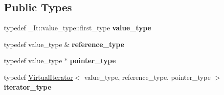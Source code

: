 \subsection*{Public Types}
\begin{DoxyCompactItemize}
\item 
typedef \+\_\+\+It\+::value\+\_\+type\+::first\+\_\+type {\bfseries value\+\_\+type}\hypertarget{classAudio_1_1VirtualKeysIterator_ae91145208dec882df8051513a8e9645c}{}\label{classAudio_1_1VirtualKeysIterator_ae91145208dec882df8051513a8e9645c}

\item 
typedef value\+\_\+type \& {\bfseries reference\+\_\+type}\hypertarget{classAudio_1_1VirtualKeysIterator_ae3731531208b2a4c4acee4289b462796}{}\label{classAudio_1_1VirtualKeysIterator_ae3731531208b2a4c4acee4289b462796}

\item 
typedef value\+\_\+type $\ast$ {\bfseries pointer\+\_\+type}\hypertarget{classAudio_1_1VirtualKeysIterator_ad954409eaff9d99c07c30c5909404d93}{}\label{classAudio_1_1VirtualKeysIterator_ad954409eaff9d99c07c30c5909404d93}

\item 
typedef \hyperlink{classAudio_1_1VirtualIterator}{Virtual\+Iterator}$<$ value\+\_\+type, reference\+\_\+type, pointer\+\_\+type $>$ {\bfseries iterator\+\_\+type}\hypertarget{classAudio_1_1VirtualKeysIterator_a787b2a958994e23e144c254dc0856dd5}{}\label{classAudio_1_1VirtualKeysIterator_a787b2a958994e23e144c254dc0856dd5}

\end{DoxyCompactItemize}
